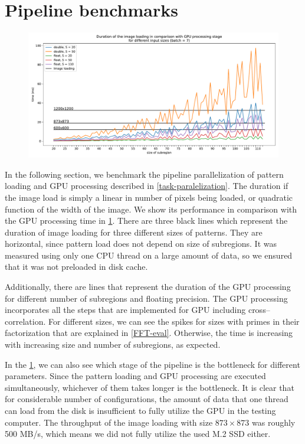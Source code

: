 \section{Pipeline benchmarks}

\begin{figure}
	\centering
	\includegraphics[width=\textwidth]{img/eval/load-plot}
	\caption{}
	\label{load-plot}
\end{figure}

In the following section, we benchmark the pipeline parallelization of pattern loading and GPU processing described in \cref{task-paralelization}. The duration if the image load is simply a linear in number of pixels being loaded, or quadratic function of the width of the image. We show its performance in comparison with the GPU processing time in \cref{load-plot}. There are three black lines which represent the duration of image loading for three different sizes of patterns. They are horizontal, since pattern load does not depend on size of subregions. It was measured using only one CPU thread on a large amount of data, so we ensured that it was not preloaded in disk cache.

Additionally, there are lines that represent the duration of the GPU processing for different number of subregions and floating precision. The GPU processing incorporates all the steps that are implemented for GPU including cross--correlation. For different sizes, we can see the spikes for sizes with primes in their factorization that are explained in \cref{FFT-eval}. Otherwise, the time is increasing with increasing size and number of subregions, as expected.

In the \cref{load-plot}, we can also see which stage of the pipeline is the bottleneck for different parameters. Since the pattern loading and GPU processing are executed simultaneously, whichever of them takes longer is the bottleneck. It is clear that for considerable number of configurations, the amount of data that one thread can load from the disk is insufficient to fully utilize the GPU in the testing computer. The throughput of the image loading with size $873\times873$ was roughly 500 MB/s, which means we did not fully utilize the used M.2 SSD either.

